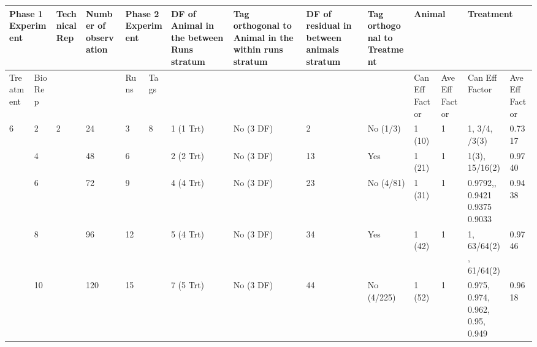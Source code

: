 \begin{tabular}{|p{0.5in}|p{0.3in}|p{0.5in}|p{0.7in}|p{0.3in}|p{0.3in}|p{0.7in}|p{0.7in}|p{0.6in}|p{0.6in}|p{0.4in}|p{0.4in}|p{0.6in}|p{0.4in}|} \hline 
\multicolumn{2}{|p{1in}|}{Phase 1 Experiment} & Technical Rep & Number of observation  & \multicolumn{2}{|p{0.7in}|}{Phase 2 Experiment} & DF of Animal in the between Runs stratum  & Tag orthogonal to Animal in the within runs stratum & DF of residual in between animals stratum & Tag orthogonal to Treatment & \multicolumn{2}{|p{0.8in}|}{Animal} & \multicolumn{2}{|p{1.0in}|}{Treatment} \\ \hline 
Treatment & Bio Rep &  &  & Runs & Tags  &  &  &  &  & Can Eff Factor & Ave Eff Factor & Can Eff Factor & Ave Eff Factor \\ \hline 
6 & 2 & 2 & 24 & 3 & 8 & 1 (1 Trt) & No (3 DF) & 2 & No (1/3) & 1 (10) & 1 & 1, 3/4, \newline 2/3(3)  & 0.7317 \\ \hline 
 & 4 &  & 48 & 6 &  & 2 (2 Trt) & No (3 DF) & 13 & Yes & 1 (21) & 1 & 1(3), 15/16(2) & 0.9740 \\ \hline 
 & 6 &  & 72 & 9 &  & 4 (4 Trt) & No (3 DF) & 23 & No (4/81) & 1 (31) & 1 & 0.9792,\newline 0.9601, 0.9421 0.9375 0.9033 & 0.9438\newline  \\ \hline 
 & 8 &  & 96 & 12 &  & 5 (4 Trt) & No (3 DF) & 34 & Yes & 1 (42) & 1 & 1, 63/64(2), 61/64(2)  & 0.9746 \\ \hline 
 & 10 &  & 120 & 15 &  & 7 (5 Trt) & No (3 DF) & 44 & No (4/225) & 1 (52) & 1 & 0.975, 0.974, 0.962, 0.95, 0.949 & 0.9618 \\ \hline 
\end{tabular}



\noindent \eject 

\noindent 

